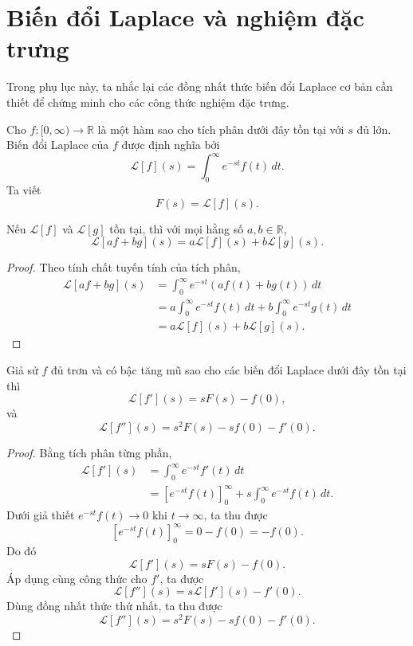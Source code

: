 ﻿\documentclass[12pt]{article}
\begin{document}
\section{Biến đổi Laplace và nghiệm đặc trưng}
\label{appendix:laplace-characteristic}

Trong phụ lục này, ta nhắc lại các đồng nhất thức biến đổi Laplace cơ bản cần thiết để chứng minh cho các công thức nghiệm đặc trưng.

\begin{definition}
Cho $f:[0, \infty) \to \mathbb R$ là một hàm sao cho tích phân dưới đây tồn tại với $s$ đủ lớn. Biến đổi Laplace của $f$ được định nghĩa bởi
\[
 \mathcal L[f](s)
 = \int_0^\infty e^{-st}f(t)\, dt.
\]
Ta viết
\[
 F(s) = \mathcal L[f](s).
\]
\end{definition}

\begin{lemma}
Nếu $\mathcal L[f]$ và $\mathcal L[g]$ tồn tại, thì với mọi hằng số $a, b \in \mathbb R$,
\[
 \mathcal L[af + bg](s)
 =
 a\mathcal L[f](s) + b\mathcal L[g](s).
\]
\end{lemma}

\begin{proof}
Theo tính chất tuyến tính của tích phân,
\[
\begin{aligned}
 \mathcal L[af + bg](s)
 & = \int_0^\infty e^{-st}(af(t) + bg(t))\, dt\\
 & =
 a \int_0^\infty e^{-st}f(t)\, dt
 +
 b \int_0^\infty e^{-st}g(t)\, dt\\
 & =
 a\mathcal L[f](s) + b\mathcal L[g](s).
\end{aligned}
\]
\end{proof}

\begin{lemma}
Giả sử $f$ đủ trơn và có bậc tăng mũ sao cho các biến đổi Laplace dưới đây tồn tại thì
\[
 \mathcal L[f'](s) = sF(s) - f(0),
\]
và
\[
 \mathcal L[f''](s) = s^2F(s) - sf(0) - f'(0).
\]
\end{lemma}

\begin{proof}
Bằng tích phân từng phần,
\[
\begin{aligned}
 \mathcal L[f'](s)
 & = \int_0^\infty e^{-st}f'(t)\, dt\\
 & =
 \left[e^{-st}f(t)\right]_0^\infty
 +
 s \int_0^\infty e^{-st}f(t)\, dt.
\end{aligned}
\]
Dưới giả thiết $e^{-st}f(t) \to 0$ khi $t \to \infty$, ta thu được
\[
 \left[e^{-st}f(t)\right]_0^\infty
 =
 0 - f(0)
 =
 -f(0).
\]
Do đó
\[
 \mathcal L[f'](s) = sF(s) - f(0).
\]
Áp dụng cùng công thức cho $f'$, ta được
\[
 \mathcal L[f''](s)
 =
 s\mathcal L[f'](s) - f'(0).
\]
Dùng đồng nhất thức thứ nhất, ta thu được
\[
 \mathcal L[f''](s) = s^2F(s) - sf(0) - f'(0).
\]
\end{proof}
\end{document}
